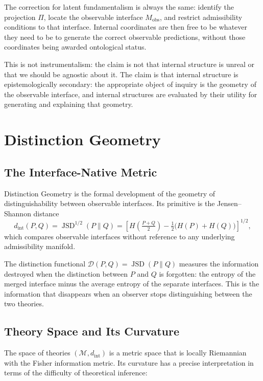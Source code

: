 \documentclass[12pt,a4paper]{book}
\theoremstyle{remark}
\theoremstyle{definition}
\begin{document}
The correction for latent fundamentalism is always the same: identify the
projection $\Pi$, locate the observable interface $M_{\mathrm{obs}}$, and
restrict admissibility conditions to that interface. Internal coordinates
are then free to be whatever they need to be to generate the correct
observable predictions, without those coordinates being awarded
ontological status.

This is not instrumentalism: the claim is not that internal structure is
unreal or that we should be agnostic about it. The claim is that internal
structure is epistemologically secondary: the appropriate object of inquiry
is the geometry of the observable interface, and internal structures are
evaluated by their utility for generating and explaining that geometry.

\chapter{Distinction Geometry}

\section{The Interface-Native Metric}

Distinction Geometry is the formal development of the geometry of
distinguishability between observable interfaces. Its primitive is the
Jensen--Shannon distance
\begin{equation}
  d_{\mathrm{int}}(P,Q)
  = \operatorname{JSD}^{1/2}(P\|Q)
  = \left[H\!\left(\tfrac{P+Q}{2}\right)
    - \tfrac{1}{2}\bigl(H(P)+H(Q)\bigr)\right]^{1/2},
\end{equation}
which compares observable interfaces without reference to any underlying
admissibility manifold.

The distinction functional $\mathcal{D}(P,Q) = \operatorname{JSD}(P\|Q)$
measures the information destroyed when the distinction between $P$ and
$Q$ is forgotten: the entropy of the merged interface minus the average
entropy of the separate interfaces. This is the information that
disappears when an observer stops distinguishing between the two theories.

\section{Theory Space and Its Curvature}

The space of theories $(\mathcal{M}, d_{\mathrm{int}})$ is a metric
space that is locally Riemannian with the Fisher information metric.
Its curvature has a precise interpretation in terms of the difficulty
of theoretical inference:
\end{document}
